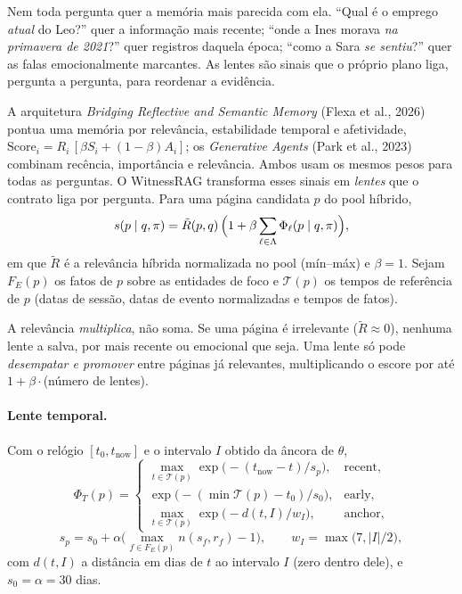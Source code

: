 \documentclass[11pt]{article}
\begin{document}
\begin{intuicao}
Nem toda pergunta quer a memória mais parecida com ela. ``Qual é o emprego
\emph{atual} do Leo?'' quer a informação mais recente; ``onde a Ines morava
\emph{na primavera de 2021}?'' quer registros daquela época; ``como a Sara
\emph{se sentiu}?'' quer as falas emocionalmente marcantes. As lentes são
sinais que o próprio plano liga, pergunta a pergunta, para reordenar a
evidência.
\end{intuicao}

A arquitetura \emph{Bridging Reflective and Semantic Memory} (Flexa et al.,
2026) pontua uma memória por relevância, estabilidade temporal e
afetividade, $\mathrm{Score}_i=R_i\,[\beta S_i+(1-\beta)A_i]$; os
\emph{Generative Agents} (Park et al., 2023) combinam recência, importância e
relevância. Ambos usam os mesmos pesos para todas as perguntas. O WitnessRAG
transforma esses sinais em \emph{lentes} que o contrato liga por pergunta.
Para uma página candidata $p$ do pool híbrido,
\begin{equation}
  s(p\mid q,\pi)=\tilde R(p,q)\,\Bigl(1+\beta\sum_{\ell\in\Lambda}\Phi_\ell(p\mid q,\pi)\Bigr),
  \label{eq:lente}
\end{equation}
em que $\tilde R$ é a relevância híbrida normalizada no pool (mín--máx) e
$\beta=1$. Sejam $F_E(p)$ os fatos de $p$ sobre as entidades de foco e
$\mathcal{T}(p)$ os tempos de referência de $p$ (datas de sessão, datas de
evento normalizadas e tempos de fatos).

\begin{empalavras}
A relevância \emph{multiplica}, não soma. Se uma página é irrelevante
($\tilde R\approx0$), nenhuma lente a salva, por mais recente ou emocional
que seja. Uma lente só pode \emph{desempatar e promover} entre páginas já
relevantes, multiplicando o escore por até $1+\beta\cdot$(número de lentes).
\end{empalavras}

\paragraph{Lente temporal.}
Com o relógio $[t_0,t_{\text{now}}]$ e o intervalo $I$ obtido da âncora de
$\theta$,
\begin{equation}
  \Phi_T(p)=
  \begin{cases}
   \max_{t\in\mathcal{T}(p)}\exp\!\bigl(-(t_{\text{now}}-t)/s_p\bigr),
     & \text{recent},\\
   \exp\!\bigl(-(\min\mathcal{T}(p)-t_0)/s_0\bigr), & \text{early},\\
   \max_{t\in\mathcal{T}(p)}\exp\!\bigl(-d(t,I)/w_I\bigr), & \text{anchor},
  \end{cases}
  \label{eq:temporal}
\end{equation}
\[
s_p=s_0+\alpha\bigl(\max_{f\in F_E(p)}n(s_f,r_f)-1\bigr),
\qquad w_I=\max\bigl(7,|I|/2\bigr),
\]
com $d(t,I)$ a distância em dias de $t$ ao intervalo $I$ (zero dentro dele),
e $s_0=\alpha=30$ dias.
\end{document}
